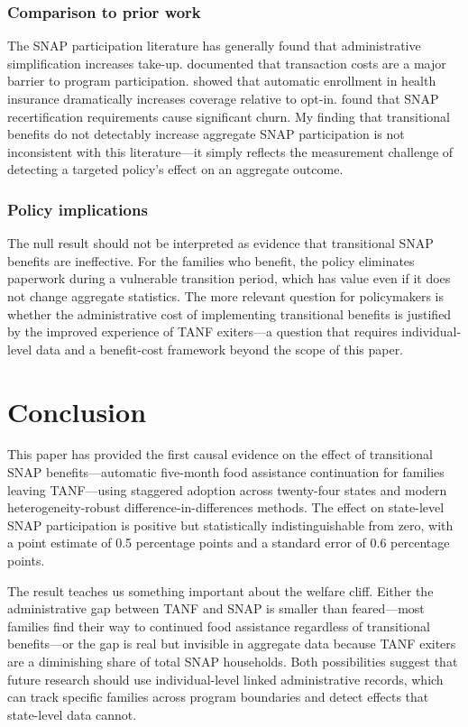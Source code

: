 \documentclass[12pt]{article}
\begin{document}
\subsubsection*{Comparison to prior work} The SNAP participation literature has generally found that administrative simplification increases take-up. \citet{currie2006take} documented that transaction costs are a major barrier to program participation. \citet{finkelstein2019take} showed that automatic enrollment in health insurance dramatically increases coverage relative to opt-in. \citet{homonoff2021does} found that SNAP recertification requirements cause significant churn. My finding that transitional benefits do not detectably increase aggregate SNAP participation is not inconsistent with this literature---it simply reflects the measurement challenge of detecting a targeted policy's effect on an aggregate outcome.

\subsubsection*{Policy implications} The null result should not be interpreted as evidence that transitional SNAP benefits are ineffective. For the families who benefit, the policy eliminates paperwork during a vulnerable transition period, which has value even if it does not change aggregate statistics. The more relevant question for policymakers is whether the administrative cost of implementing transitional benefits is justified by the improved experience of TANF exiters---a question that requires individual-level data and a benefit-cost framework beyond the scope of this paper.


\section{Conclusion}

This paper has provided the first causal evidence on the effect of transitional SNAP benefits---automatic five-month food assistance continuation for families leaving TANF---using staggered adoption across twenty-four states and modern heterogeneity-robust difference-in-differences methods. The effect on state-level SNAP participation is positive but statistically indistinguishable from zero, with a point estimate of 0.5 percentage points and a standard error of 0.6 percentage points.

The result teaches us something important about the welfare cliff. Either the administrative gap between TANF and SNAP is smaller than feared---most families find their way to continued food assistance regardless of transitional benefits---or the gap is real but invisible in aggregate data because TANF exiters are a diminishing share of total SNAP households. Both possibilities suggest that future research should use individual-level linked administrative records, which can track specific families across program boundaries and detect effects that state-level data cannot.
\end{document}
